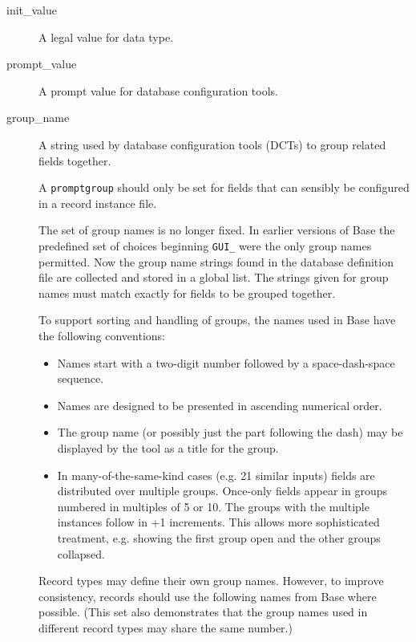 \begin{description}
\item [init\_value] A legal value for data type.

\item [prompt\_value] A prompt value for database configuration tools.

\item [group\_name] A string used by database configuration tools (DCTs) to group related fields together.

A \verb|promptgroup| should only be set for fields that can sensibly be configured in a record instance file.

The set of group names is no longer fixed.
In earlier versions of Base the predefined set of choices beginning \verb|GUI_| were the only group names permitted.
Now the group name strings found in the database definition file are collected and stored in a global list.
The strings given for group names must match exactly for fields to be grouped together.

To support sorting and handling of groups, the names used in Base have the following conventions:

\begin{itemize}
\item Names start with a two-digit number followed by a space-dash-space sequence.
\item Names are designed to be presented in ascending numerical order.
\item The group name (or possibly just the part following the dash) may be displayed by the tool as a title for the group.
\item In many-of-the-same-kind cases (e.g. 21 similar inputs) fields are distributed over multiple groups.
Once-only fields appear in groups numbered in multiples of 5 or 10.
The groups with the multiple instances follow in +1 increments.
This allows more sophisticated treatment, e.g. showing the first group open and the other groups collapsed.
\end{itemize}

Record types may define their own group names.
However, to improve consistency, records should use the following names from Base where possible.
(This set also demonstrates that the group names used in different record types may share the same number.)


\end{description}
